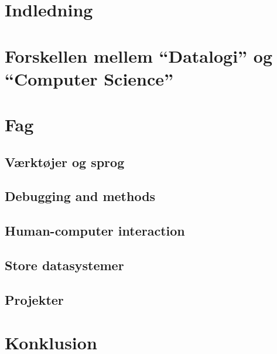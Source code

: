 \documentclass[10pt,a4paper]{article}
\begin{document}
\section{Indledning}

\section{Forskellen mellem ``Datalogi'' og ``Computer Science''}


\section{Fag}
\subsection{Værktøjer og sprog}

\subsection{Debugging and methods}

\subsection{Human-computer interaction}

\subsection{Store datasystemer}

\subsection{Projekter}

\section{Konklusion}
\end{document}
